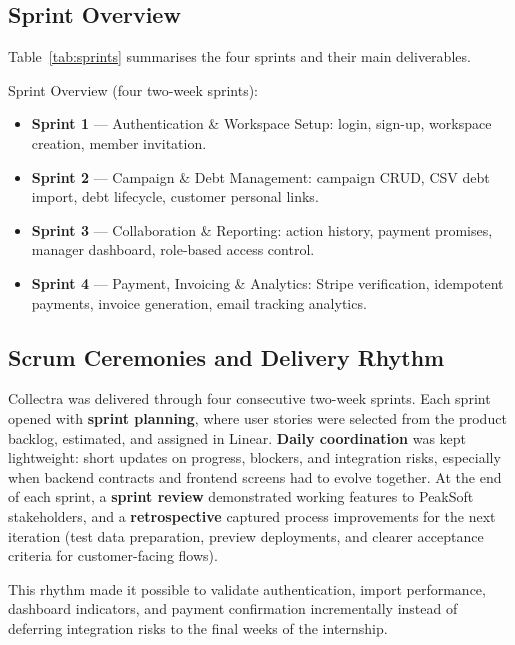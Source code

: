 ﻿\documentclass[12pt,a4paper]{report}
\begin{document}
\subsection{Sprint Overview}

Table~\ref{tab:sprints} summarises the four sprints and their main deliverables.

\noindent Sprint Overview (four two-week sprints):

\begin{itemize}
  \item \textbf{Sprint 1} — Authentication \& Workspace Setup: login, sign-up, workspace creation, member invitation.
  \item \textbf{Sprint 2} — Campaign \& Debt Management: campaign CRUD, CSV debt import, debt lifecycle, customer personal links.
  \item \textbf{Sprint 3} — Collaboration \& Reporting: action history, payment promises, manager dashboard, role-based access control.
  \item \textbf{Sprint 4} — Payment, Invoicing \& Analytics: Stripe verification, idempotent payments, invoice generation, email tracking analytics.
\end{itemize}

\subsection{Scrum Ceremonies and Delivery Rhythm}

Collectra was delivered through four consecutive two-week sprints.
Each sprint opened with \textbf{sprint planning}, where user stories were selected from
the product backlog, estimated, and assigned in Linear.
\textbf{Daily coordination} was kept lightweight: short updates on progress, blockers,
and integration risks, especially when backend contracts and frontend screens had to
evolve together.
At the end of each sprint, a \textbf{sprint review} demonstrated working features to
PeakSoft stakeholders, and a \textbf{retrospective} captured process improvements for
the next iteration (test data preparation, preview deployments, and clearer acceptance
criteria for customer-facing flows).

This rhythm made it possible to validate authentication, import performance, dashboard
indicators, and payment confirmation incrementally instead of deferring integration
risks to the final weeks of the internship.

\end{document}
